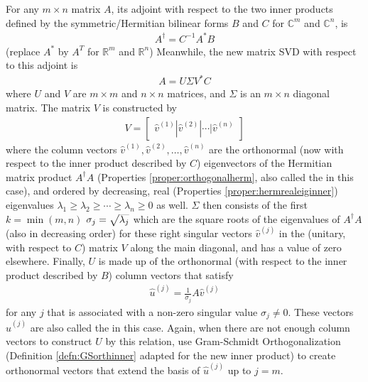 \begin{defn}
\label{defn:SVDadjoint}
For any $m \times n$ matrix $A$, its adjoint with respect to the two inner products defined by the symmetric/Hermitian bilinear forms $B$ and $C$ for $\mathbb{C}^m$ and $\mathbb{C}^n$, is
\begin{align}
A^\dag = C^{-1} A^* B \label{eqn:altadjoint}
\end{align}
(replace $A^*$ by $A^T$ for $\mathbb{R}^m$ and $\mathbb{R}^n$) Meanwhile, the new matrix SVD with respect to this adjoint is
\begin{align}
A = U\Sigma V^*C \label{eqn:SVDadjoint}
\end{align}
where $U$ and $V$ are $m \times m$ and $n \times n$ matrices, and $\Sigma$ is an $m \times n$ diagonal matrix. The matrix $V$ is constructed by
\begin{align}
V = 
\begin{bmatrix}
\hat{v}^{(1)} | \hat{v}^{(2)} | \cdots | \hat{v}^{(n)}
\end{bmatrix}
\end{align}
where the column vectors $\hat{v}^{(1)}, \hat{v}^{(2)}, \ldots, \hat{v}^{(n)}$ are the orthonormal (now with respect to the inner product described by $C$) eigenvectors of the Hermitian matrix product $A^\dag A$ (Properties \ref{proper:orthogonalherm}, also called the  in this case), and ordered by decreasing, real (Properties 
\ref{proper:hermrealeiginner}) eigenvalues $\lambda_1 \geq \lambda_2 \geq \cdots \geq \lambda_n \geq 0$ as well. $\Sigma$ then consists of the first $k = \min(m,n)$  $\sigma_j = \smash{\sqrt{\lambda_j}}$ which are the square roots of the eigenvalues of $A^\dag A$ (also in decreasing order) for these right singular vectors $\hat{v}^{(j)}$ in the (unitary, with respect to $C$) matrix $V$ along the main diagonal, and has a value of zero elsewhere. Finally, $U$ is made up of the orthonormal (with respect to the inner product described by $B$) column vectors that satisfy
\begin{align}
\hat{u}^{(j)} = \frac{1}{\sigma_j} A\hat{v}^{(j)} \label{eqn:leftsingadjoint}
\end{align}
for any $j$ that is associated with a non-zero singular value $\sigma_j \neq 0$. These vectors $\hat{u}^{(j)}$ are also called the  in this case. Again, when there are not enough column vectors to construct $U$ by this relation, use Gram-Schmidt Orthogonalization (Definition \ref{defn:GSorthinner} adapted for the new inner product) to create orthonormal vectors that extend the basis of $\hat{u}^{(j)}$ up to $j = m$.
\end{defn}
